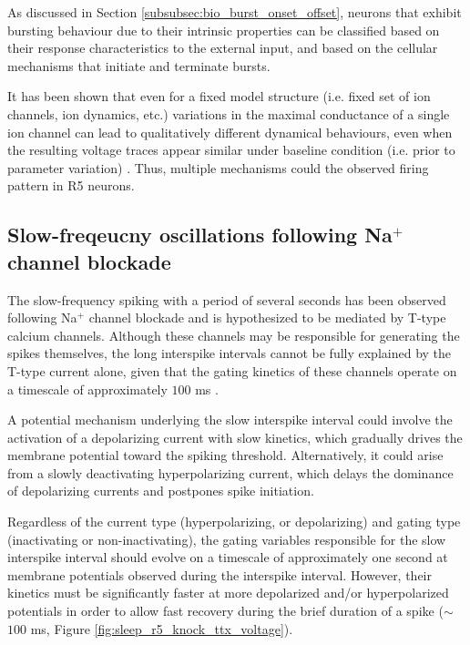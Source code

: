 \documentclass[../main.tex]{subfiles}
\begin{document}
As discussed in Section \ref{subsubsec:bio_burst_onset_offset}, neurons that exhibit bursting behaviour due to their intrinsic properties can be classified based on their response characteristics to the external input, and based on the cellular mechanisms that initiate and terminate bursts.

It has been shown that even for a fixed model structure (i.e. fixed set of ion channels, ion dynamics, etc.) variations in the maximal conductance of a single ion channel can lead to qualitatively different dynamical behaviours, even when the resulting voltage traces appear similar under baseline condition (i.e. prior to parameter variation) \parencite{alonsoVisualizationCurrentsNeural2019}.
Thus, multiple mechanisms could the observed firing pattern in R5 neurons.



\subsection{Slow-freqeucny oscillations following Na$^+$ channel blockade}

The slow-frequency spiking with a period of several seconds has been observed following Na$^+$ channel blockade and is hypothesized to be mediated by T-type calcium channels.
Although these channels may be responsible for generating the spikes themselves, the long interspike intervals cannot be fully explained by the T-type current alone, given that the gating kinetics of these channels operate on a timescale of approximately $100$ ms \parencite{jeongCaa1TFlyTtype2015}.

A potential mechanism underlying the slow interspike interval could involve the activation of a depolarizing current with slow kinetics, which gradually drives the membrane potential toward the spiking threshold. Alternatively, it could arise from a slowly deactivating hyperpolarizing current, which delays the dominance of depolarizing currents and postpones spike initiation.

Regardless of the current type (hyperpolarizing, or depolarizing) and gating type (inactivating or non-inactivating),  the gating variables responsible for the slow interspike interval should evolve on a timescale of approximately one second at membrane potentials observed during the interspike interval. However, their kinetics must be significantly faster at more depolarized and/or hyperpolarized potentials in order to allow fast recovery during the brief duration of a spike ($\sim$$100$ ms, Figure \ref{fig:sleep_r5_knock_ttx_voltage}).
\end{document}
